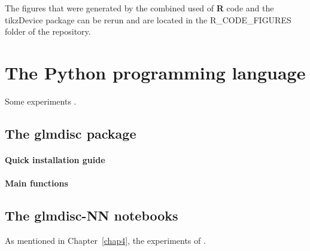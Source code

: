 The figures that were generated by the combined used of \textbf{R} code and the tikzDevice package can be rerun and are located in the R\_CODE\_FIGURES folder of the repository.

\section{The Python programming language}

Some experiments .


\subsection{The glmdisc package}


\paragraph{Quick installation guide}


\paragraph{Main functions}




\subsection{The glmdisc-NN notebooks}

As mentioned in Chapter~\ref{chap4}, the experiments of .
